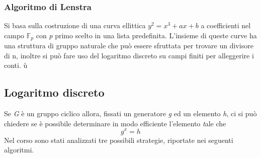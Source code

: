 \documentclass{article}
\begin{document}
	\subsubsection{Algoritmo di Lenstra}
	Si basa sulla costruzione di una curva ellittica \(y^2=x^3+ax+b\) a coefficienti nel campo \(\mathbb{F}_p\) con \textit{p} primo scelto in una lista predefinita. L'insieme di queste curve ha una struttura di gruppo naturale che può essere sfruttata per trovare un divisore di n, inoltre si può fare uso del logaritmo discreto su campi finiti per alleggerire i conti. ù
	\vspace{1cm}
	
	\vspace{1cm}\vspace{1cm}
	
	\subsection{Logaritmo discreto}
	Se \textit{G} è un gruppo ciclico allora, fissati un generatore \textit{g} ed un elemento \textit{h}, ci si può chiedere se è possibile determinare in modo efficiente l'elemento \textit tale che \[g^x=h\]
	Nel corso sono stati analizzati tre possibili strategie, riportate nei seguenti algoritmi. 
	\vspace{1cm}
	
	\vspace{1cm}\vspace{1cm}
	
	\vspace{1cm}
	
	\vspace{1cm}\vspace{1cm}
	
	\vspace{1cm}
	
	\vspace{1cm}\vspace{1cm}
	
\end{document}
